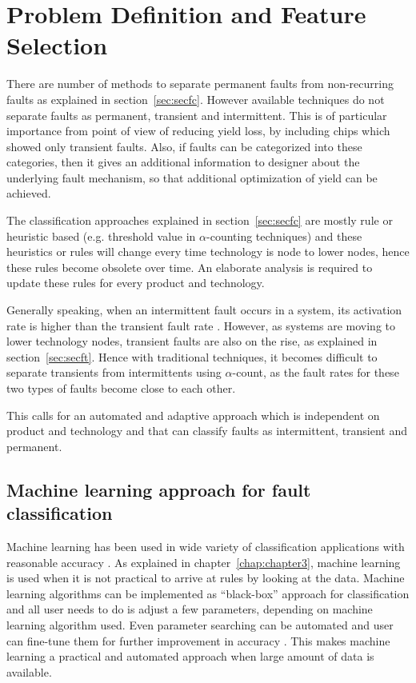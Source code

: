 \chapter{Problem Definition and Feature Selection}
\label{chap:chapter4}
There are number of methods to separate permanent faults from non-recurring faults as explained in section~\ref{sec:secfc}. However available techniques do not separate faults as permanent, transient and intermittent. This is of particular importance from point of view of reducing yield loss, by including chips which showed only transient faults. Also, if faults can be categorized into these categories, then it gives an additional information to designer about the underlying fault mechanism, so that additional optimization of yield can be achieved. 

The classification approaches explained in section~\ref{sec:secfc} are mostly rule or heuristic based (e.g. threshold value in $\alpha$-counting techniques) and these heuristics or rules will change every time technology is node to lower nodes, hence these rules become obsolete over time. An elaborate analysis is required to update these rules for every product and technology.

Generally speaking, when an intermittent fault occurs in a system, its activation rate is higher than the transient fault rate \cite{Bondavalli2000}. However, as systems are moving to lower technology nodes, transient faults are also on the rise, as explained in section~\ref{sec:secft}. Hence with traditional techniques, it becomes difficult to separate transients from intermittents using $\alpha$-count, as the fault rates for these two types of faults become close to each other.

This calls for an automated and adaptive approach which is independent on product and technology and that can classify faults as intermittent, transient and permanent. 

\section{Machine learning approach for fault classification}

Machine learning has been used in wide variety of classification applications with reasonable accuracy \cite{Pang2002,Nguyen2008,Sebastiani2002, Kotsiantis2007}. As explained in chapter~\ref{chap:chapter3}, machine learning is used when it is not practical to arrive at rules by looking at the data. Machine learning algorithms can be implemented as \enquote{black-box} approach for classification and all user needs to do is adjust a few parameters, depending on machine learning algorithm used. Even parameter searching can be automated and user can fine-tune them for further improvement in accuracy \cite{Hsu2003, Castillo2000}. This makes machine learning a practical and automated approach when large amount of data is available.

